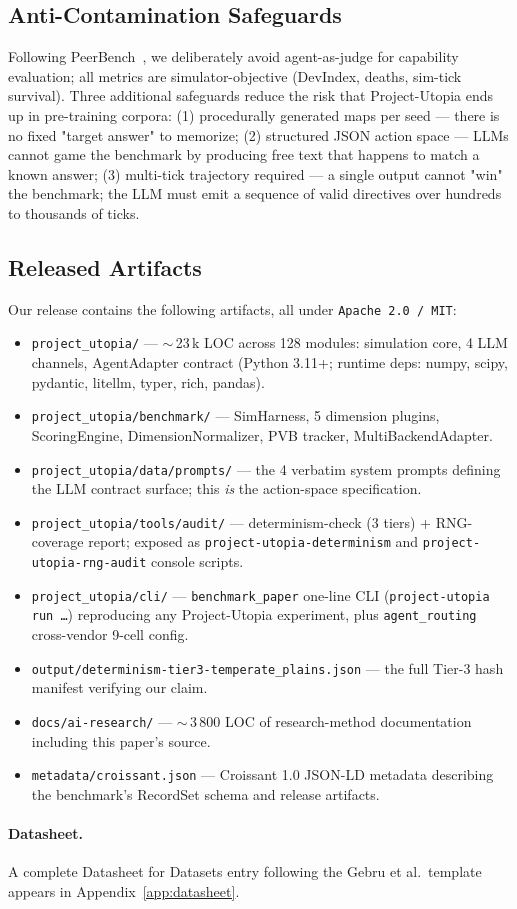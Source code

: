 \subsection{Anti-Contamination Safeguards}

Following PeerBench~\citep{Cheng2025PeerBench}, we deliberately
avoid agent-as-judge for capability evaluation; all metrics
are simulator-objective (DevIndex, deaths, sim-tick survival).
Three additional safeguards reduce the risk that Project-Utopia
ends up in pre-training corpora:
(1) procedurally generated maps per seed --- there is no fixed
"target answer" to memorize;
(2) structured JSON action space --- LLMs cannot game the
benchmark by producing free text that happens to match a known
answer;
(3) multi-tick trajectory required --- a single output cannot
"win" the benchmark; the LLM must emit a sequence of valid
directives over hundreds to thousands of ticks.

\subsection{Released Artifacts}

Our release contains the following artifacts, all under
\texttt{Apache 2.0 / MIT}:

\begin{itemize}[leftmargin=*]
\item \texttt{project\_utopia/} --- $\sim$\,23\,k LOC across 128
modules: simulation core, 4 LLM channels, AgentAdapter contract
(Python 3.11+; runtime deps: numpy, scipy, pydantic, litellm,
typer, rich, pandas).
\item \texttt{project\_utopia/benchmark/} --- SimHarness, 5 dimension
plugins, ScoringEngine, DimensionNormalizer, PVB tracker,
MultiBackendAdapter.
\item \texttt{project\_utopia/data/prompts/} --- the 4 verbatim
system prompts defining the LLM contract surface; this \emph{is}
the action-space specification.
\item \texttt{project\_utopia/tools/audit/} --- determinism-check
(3 tiers) + RNG-coverage report; exposed as
\texttt{project-utopia-determinism} and
\texttt{project-utopia-rng-audit} console scripts.
\item \texttt{project\_utopia/cli/} --- \texttt{benchmark\_paper}
one-line CLI (\texttt{project-utopia run \ldots}) reproducing
any Project-Utopia experiment, plus
\texttt{agent\_routing} cross-vendor 9-cell config.
\item \texttt{output/determinism-tier3-temperate\_plains.json} ---
the full Tier-3 hash manifest verifying our claim.
\item \texttt{docs/ai-research/} --- $\sim$\,3\,800 LOC of
research-method documentation including this paper's source.
\item \texttt{metadata/croissant.json} --- Croissant 1.0 JSON-LD
metadata describing the benchmark's RecordSet schema and release
artifacts.
\end{itemize}

\paragraph{Datasheet.} A complete Datasheet for Datasets entry
following the Gebru et al.\ template appears in
Appendix~\ref{app:datasheet}.
